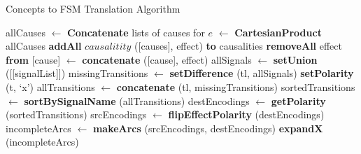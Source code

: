 \begin{algorithm}[H]
\begin{algorithmic}[1]	%
	\caption{Concepts to FSM Translation Algorithm\label{alg:fsm}}
                    \State allCauses $\leftarrow$ \textbf{Concatenate} lists of causes for $e$ \label{alg:list}
                    \State [causes] $\leftarrow$ \textbf{CartesianProduct} allCauses
                    \State \textbf{addAll} $causalitity$ ([causes], effect) \textbf{to} causalities
          \EndFor
		\State \textbf{removeAll} effect \textbf{from} [cause]
		\State [signalList] $\leftarrow$ \textbf{concatenate} ([cause], effect)
	\EndFor
	\State allSignals $\leftarrow$ \textbf{setUnion} ([[signalList]])
		\State missingTransitions $\leftarrow$ \textbf{setDifference} (tl, allSignals)
			\State \textbf{setPolarity} (t, `x')
		\EndFor
		\State allTransitions $\leftarrow$ \textbf{concatenate} (tl, missingTransitions)
		\State sortedTransitions $\leftarrow$ \textbf{sortBySignalName} (allTransitions)
		\State destEncodings $\leftarrow$ \textbf{getPolarity} (sortedTransitions)
		\State srcEncodings $\leftarrow$ \textbf{flipEffectPolarity} (destEncodings)
		\State incompleteArcs $\leftarrow$ \textbf{makeArcs} (srcEncodings, destEncodings)
		\State \textbf{expandX} (incompleteArcs)
	\EndFor
\end{algorithmic}
\end{algorithm}
